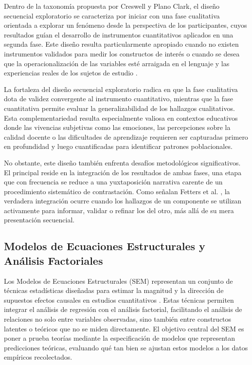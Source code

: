 \documentclass[conference]{IEEEtran}
\begin{document}
Dentro de la taxonomía propuesta por Creswell y Plano Clark, el diseño secuencial exploratorio se caracteriza por iniciar con una fase cualitativa orientada a explorar un fenómeno desde la perspectiva de los participantes, cuyos resultados guían el desarrollo de instrumentos cuantitativos aplicados en una segunda fase. Este diseño resulta particularmente apropiado cuando no existen instrumentos validados para medir los constructos de interés o cuando se desea que la operacionalización de las variables esté arraigada en el lenguaje y las experiencias reales de los sujetos de estudio \cite{creswellDesigningConductingMixed} \cite{tashakkoriFoundationsMixedMethods2021}.

La fortaleza del diseño secuencial exploratorio radica en que la fase cualitativa dota de validez convergente al instrumento cuantitativo, mientras que la fase cuantitativa permite evaluar la generalizabilidad de los hallazgos cualitativos. Esta complementariedad resulta especialmente valiosa en contextos educativos donde las vivencias subjetivas como las emociones, las percepciones sobre la calidad docente o las dificultades de aprendizaje requieren ser capturadas primero en profundidad y luego cuantificadas para identificar patrones poblacionales.

No obstante, este diseño también enfrenta desafíos metodológicos significativos. El principal reside en la integración de los resultados de ambas fases, una etapa que con frecuencia se reduce a una yuxtaposición narrativa carente de un procedimiento sistemático de contrastación. Como señalan Fetters et al. \cite{fettersAchievingIntegrationMixed2013}, la verdadera integración ocurre cuando los hallazgos de un componente se utilizan activamente para informar, validar o refinar los del otro, más allá de su mera presentación secuencial.

\subsection{Modelos de Ecuaciones Estructurales y Análisis Factoriales}
Los Modelos de Ecuaciones Estructurales (SEM) representan un conjunto de técnicas estadísticas diseñadas para estimar la magnitud y la dirección de supuestos efectos causales en estudios cuantitativos \cite{kline2023principles}. Estas técnicas permiten integrar el análisis de regresión con el análisis factorial, facilitando el análisis de relaciones no solo entre variables observadas, sino también entre constructos latentes o teóricos que no se miden directamente. El objetivo central del SEM es poner a prueba teorías mediante la especificación de modelos que representan predicciones teóricas, evaluando qué tan bien se ajustan estos modelos a los datos empíricos recolectados.
\end{document}

